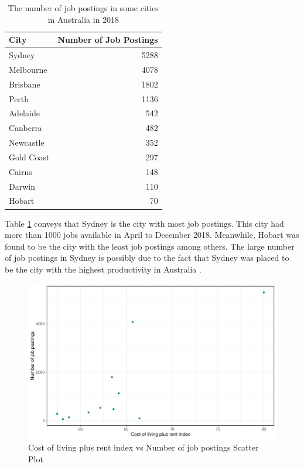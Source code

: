 \documentclass[11pt,a4paper,]{article}
\begin{document}
\begin{table}

\caption{\label{tab:jobcity}The number of job postings in some cities in Australia in 2018}
\centering
\begin{tabular}[t]{lr}
\toprule
City & Number of Job Postings\\
\midrule
Sydney & 5288\\
Melbourne & 4078\\
Brisbane & 1802\\
Perth & 1136\\
Adelaide & 542\\
\addlinespace
Canberra & 482\\
Newcastle & 352\\
Gold Coast & 297\\
Cairns & 148\\
Darwin & 110\\
\addlinespace
Hobart & 70\\
\bottomrule
\end{tabular}
\end{table}

Table \ref{tab:jobcity} conveys that Sydney is the city with most job postings. This city had more than 1000 jobs available in April to December 2018. Meanwhile, Hobart was found to be the city with the least job postings among others. The large number of job postings in Sydney is possibly due to the fact that Sydney was placed to be the city with the highest productivity in Australia \autocite{pwcreport}.

\begin{figure}
\centering
\includegraphics{Team_JHDP_Assignment4_files/figure-latex/corrplot-1.pdf}
\caption{\label{fig:corrplot}Cost of living plus rent index vs Number of job postings Scatter Plot}
\end{figure}
\end{document}
